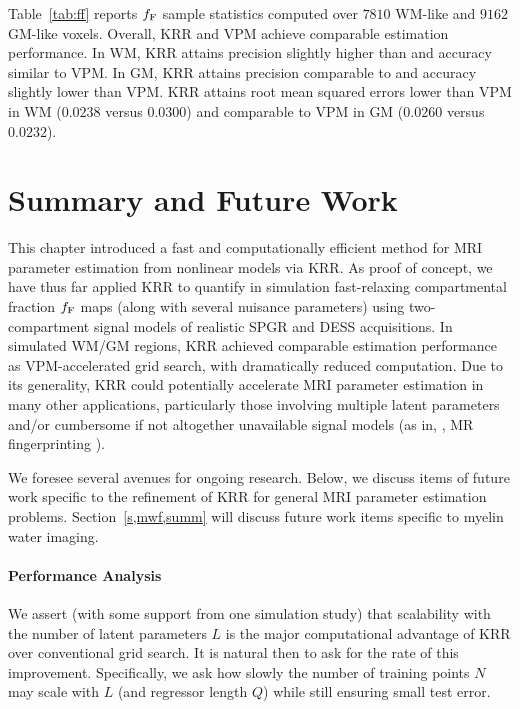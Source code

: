 Table~\ref{tab:ff} reports $f_{\mathrm{F}}$ sample statistics 
computed over $7810$ WM-like and $9162$ GM-like voxels. 
Overall, 
KRR and VPM achieve comparable estimation performance.
In WM,
KRR attains precision slightly higher than
and accuracy similar to VPM.
In GM,
KRR attains precision comparable to
and accuracy slightly lower than VPM.
KRR attains root mean squared errors
lower than VPM in WM ($0.0238$ versus $0.0300$)
and comparable to VPM in GM ($0.0260$ versus $0.0232$).

\section{Summary and Future Work}
\label{s,krr,summ}

This chapter introduced
a fast and computationally efficient method
for MRI parameter estimation
from nonlinear models
via KRR.
As proof of concept,
we have thus far applied KRR
to quantify in simulation
fast-relaxing compartmental fraction $f_{\mathrm{F}}$ maps
(along with several nuisance parameters)
using two-compartment signal models
of realistic SPGR and DESS acquisitions.
In simulated \ffest WM/GM regions,
KRR achieved comparable estimation performance
as VPM-accelerated grid search,
with dramatically reduced computation.
Due to its generality,
KRR could potentially accelerate
MRI parameter estimation
in many other applications,
particularly those
involving multiple latent parameters
and/or
cumbersome if not altogether unavailable signal models
(as in, \eg, MR fingerprinting \cite{ma:13:mrf}).

We foresee several avenues for ongoing research.
Below, we discuss items of future work 
specific to the refinement of KRR 
for general MRI parameter estimation problems.
Section~\ref{s,mwf,summ} will discuss
future work items specific to myelin water imaging.

\paragraph{Performance Analysis}
We assert 
(with some support from one simulation study)
that scalability
with the number of latent parameters $L$
is the major computational advantage
of KRR over conventional grid search.
It is natural then to ask
for the rate of this improvement.
Specifically,
we ask how slowly the number
of training points $N$ may scale 
with $L$ (and regressor length $Q$) 
while still ensuring small test error.

